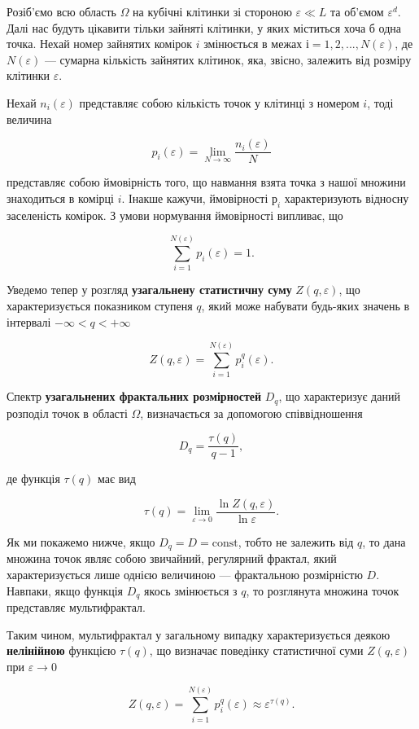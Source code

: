 \documentclass[
  letterpaper,
]{report}
\begin{document}
Розіб'ємо всю область \(\Omega\) на кубічні клітинки зі стороною
\(\varepsilon \ll L\) та об'ємом \(\varepsilon^{d}\). Далі нас будуть
цікавити тільки зайняті клітинки, у яких міститься хоча б одна точка.
Нехай номер зайнятих комірок \(i\) змінюється в межах
\(і=1, 2,..., N(\varepsilon)\), де \(N(\varepsilon)\) --- сумарна
кількість зайнятих клітинок, яка, звісно, залежить від розміру клітинки
\(\varepsilon\).

Нехай \(n_{i}(\varepsilon)\) представляє собою кількість точок у
клітинці з номером \(i\), тоді величина

\[
p_{i}(\varepsilon) = \lim_{N\to\infty}\frac{n_{i}(\varepsilon)}{N}
\]

представляє собою ймовірність того, що навмання взята точка з нашої
множини знаходиться в комірці \(i\). Інакше кажучи, ймовірності
\(р_{i}\) характеризують відносну заселеність комірок. З умови
нормування ймовірності випливає, що

\[
\sum_{i=1}^{N(\varepsilon)}p_{i}(\varepsilon)=1.
\]

Уведемо тепер у розгляд \textbf{узагальнену статистичну суму}
\(Z(q,\varepsilon)\), що характеризується показником ступеня \(q\), який
може набувати будь-яких значень в інтервалі \(-\infty<q<+\infty\)

\[
Z(q,\varepsilon)=\sum_{i=1}^{N(\varepsilon)}p_{i}^{q}(\varepsilon).
\]

Спектр \textbf{узагальнених фрактальних розмірностей} \(D_{q}\), що
характеризує даний розподіл точок в області \(\Omega\), визначається за
допомогою співвідношення

\[
D_{q} = \frac{\tau(q)}{q-1}, 
\]

де функція \(\tau(q)\) має вид

\[
\tau(q)=\lim_{\varepsilon\to 0}\frac{\ln{Z(q,\varepsilon)}}{\ln{\varepsilon}}.
\]

Як ми покажемо нижче, якщо \(D_{q}=D=\text{const}\), тобто не залежить
від \(q\), то дана множина точок являє собою звичайний, регулярний
фрактал, який характеризується лише однією величиною --- фрактальною
розмірністю \(D\). Навпаки, якщо функція \(D_{q}\) якось змінюється з
\(q\), то розглянута множина точок представляє мультифрактал.

Таким чином, мультифрактал у загальному випадку характеризується деякою
\textbf{нелінійною} функцією \(\tau(q)\), що визначає поведінку
статистичної суми \(Z(q,\varepsilon)\) при \(\varepsilon\to 0\)

\[\tag{1}
Z(q,\varepsilon)=\sum_{i=1}^{N(\varepsilon)}p_{i}^{q}(\varepsilon) \approx \varepsilon^{\tau(q)}.
\]
\end{document}
